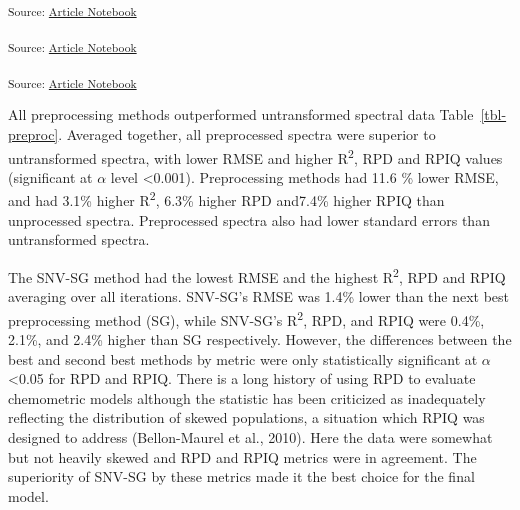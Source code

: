 \documentclass[
]{agujournal2019}
\begin{document}
\textsubscript{Source:
\href{https://rvcrawford.github.io/glowing-system/index.qmd.html}{Article
Notebook}}

\textsubscript{Source:
\href{https://rvcrawford.github.io/glowing-system/index.qmd.html}{Article
Notebook}}

\textsubscript{Source:
\href{https://rvcrawford.github.io/glowing-system/index.qmd.html}{Article
Notebook}}

All preprocessing methods outperformed untransformed spectral data
Table~\ref{tbl-preproc}. Averaged together, all preprocessed spectra
were superior to untransformed spectra, with lower RMSE and higher
R\textsuperscript{2}, RPD and RPIQ values (significant at \(\alpha\)
level \textless0.001). Preprocessing methods had 11.6 \% lower RMSE, and
had 3.1\% higher R\textsuperscript{2}, 6.3\% higher RPD and7.4\% higher
RPIQ than unprocessed spectra. Preprocessed spectra also had lower
standard errors than untransformed spectra.

The SNV-SG method had the lowest RMSE and the highest
R\textsuperscript{2}, RPD and RPIQ averaging over all iterations.
SNV-SG's RMSE was 1.4\% lower than the next best preprocessing method
(SG), while SNV-SG's R\textsuperscript{2}, RPD, and RPIQ were 0.4\%,
2.1\%, and 2.4\% higher than SG respectively. However, the differences
between the best and second best methods by metric were only
statistically significant at \(\alpha\) \textless0.05 for RPD and RPIQ.
There is a long history of using RPD to evaluate chemometric models
although the statistic has been criticized as inadequately reflecting
the distribution of skewed populations, a situation which RPIQ was
designed to address (Bellon-Maurel et al., 2010). Here the data were
somewhat but not heavily skewed and RPD and RPIQ metrics were in
agreement. The superiority of SNV-SG by these metrics made it the best
choice for the final model.
\end{document}
